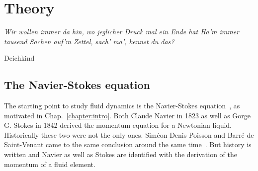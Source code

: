 \chapter{Theory}
\label{chapter:theory}
\epigraph{\textit{Wir wollen immer da hin, wo jeglicher Druck mal ein Ende hat
Ha'm immer tausend Sachen auf'm Zettel, sach' ma', kennst du das?}}{Deichkind}

\section{The Navier-Stokes equation}
\label{sec:navier_stokes_sec}
The starting point to study fluid dynamics is the Navier-Stokes equation~\cite{claude-louis-marie-henriMemoireLoisMouvement1827, stokesSteadyMotionIncompressible1848}, as motivated in Chap.~\ref{chapter:intro}.
Both Claude Navier in 1823 as well as Gorge G. Stokes in 1842 derived the momentum equation for a Newtonian liquid.
Historically these two were not the only ones. 
Siméon Denis Poisson and Barré de Saint-Venant came to the same conclusion around the same time~\cite{poissonNouvelleTheorieAction1831, de1843notea, jrHistoryAerodynamicsIts1998}.
But history is written and Navier as well as Stokes are identified with the derivation of the momentum of a fluid element. 

